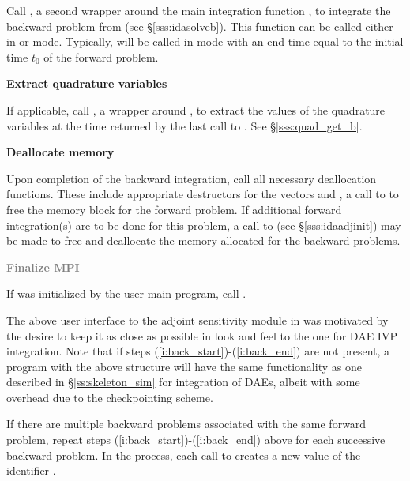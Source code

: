 \begin{Steps}
  Call , a second wrapper around the {\idas} main integration
  function , to integrate the backward problem from 
  (see \S\ref{sss:idasolveb}). This function can be called either in 
  or  mode. Typically,  will be called in 
  mode with an end time equal to the initial time $t_0$ of the forward problem.

\item \label{i:back_end}
  {\bf Extract quadrature variables}

  If applicable, call , a wrapper around ,
  to extract the values of the quadrature variables at the time returned
  by the last call to .  See \S\ref{sss:quad_get_b}.

\item
  {\bf Deallocate memory}

  Upon completion of the backward integration, call all necessary deallocation
  functions. These include appropriate destructors for the vectors  and
  , a call to  to free the {\idas} memory block for the
  forward problem.  If additional forward integration(s) are to be done for
  this problem, a call to  (see \S\ref{sss:idaadjinit}) may be
  made to free and deallocate the memory allocated for the backward problems.

\item
  \textcolor{gray}{\bf Finalize MPI}

  {\p} If {\mpi} was initialized by the user main program, call .

\end{Steps}

The above user interface to the adjoint sensitivity module in {\idas} was motivated by
the desire to keep it as close as possible in look and feel to the one for DAE IVP 
integration. Note that if steps (\ref{i:back_start})-(\ref{i:back_end}) are not present, 
a program with the above structure will have the same functionality as one described in
\S\ref{ss:skeleton_sim} for integration of DAEs, albeit with some overhead due to 
the checkpointing scheme.

If there are multiple backward problems associated with the same forward problem,
repeat steps (\ref{i:back_start})-(\ref{i:back_end}) above for each successive
backward problem.  In the process, each call to  creates a new
value of the identifier .


